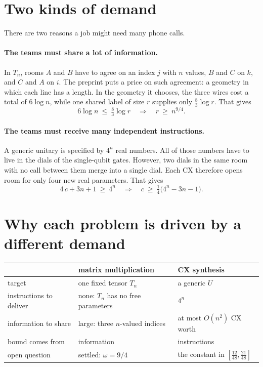 \documentclass[11pt]{article}
\begin{document}
\section*{Two kinds of demand}

There are two reasons a job might need many phone calls.

\paragraph{The teams must share a lot of information.} In $T_n$, rooms $A$ and $B$ have to agree
on an index $j$ with $n$ values, $B$ and $C$ on $k$, and $C$ and $A$ on $i$. The preprint puts a
price on such agreement: a geometry in which each line has a length. In the geometry it chooses,
the three wires cost a total of $6\log n$, while one shared label of size $r$ supplies only
$\tfrac83\log r$. That gives
\[
6\log n\ \le\ \tfrac83\log r \quad\Longrightarrow\quad r\ \ge\ n^{9/4}.
\]

\paragraph{The teams must receive many independent instructions.} A generic unitary is specified
by $4^n$ real numbers. All of those numbers have to live in the dials of the single-qubit gates.
However, two dials in the same room with no call between them merge into a single dial. Each CX
therefore opens room for only four new real parameters. That gives
\[
4\,c+3n+1\ \ge\ 4^n \quad\Longrightarrow\quad c\ \ge\ \tfrac14\big(4^n-3n-1\big).
\]

\section*{Why each problem is driven by a different demand}

\begin{center}
\begin{tabular}{@{}lll@{}}
\toprule
 & matrix multiplication & CX synthesis \\
\midrule
target & one fixed tensor $T_n$ & a generic $U$ \\
instructions to deliver & none: $T_n$ has no free parameters & $4^n$ \\
information to share & large: three $n$-valued indices & at most $O(n^2)$ CX worth \\
bound comes from & information & instructions \\
open question & settled: $\omega=9/4$ & the constant in $[\tfrac{12}{48},\tfrac{21}{48}]$ \\
\bottomrule
\end{tabular}
\end{center}
\end{document}
